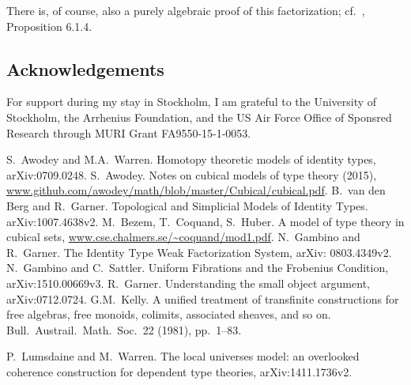 \documentclass[12pt]{article}
\theoremstyle{remark}
\theoremstyle{definition}
\begin{document}
There is, of course, also a purely algebraic proof of this factorization; cf.~\cite{GvdB}, Proposition 6.1.4.

\subsection*{Acknowledgements}
For support during my stay in Stockholm, I am grateful to the University of Stockholm, the Arrhenius Foundation, and  the US Air Force Office of Sponsred Research through MURI Grant FA9550-15-1-0053.

\begin{thebibliography}{300}

S.~Awodey and M.A.~Warren. Homotopy theoretic models of identity types, arXiv:0709.0248.
%
S.~Awodey. Notes on cubical models of type theory (2015), \url{www.github.com/awodey/math/blob/master/Cubical/cubical.pdf}.
%
B.~van den Berg and R.~Garner. Topological and Simplicial Models of Identity Types.  arXiv:1007.4638v2.
%
M.~Bezem, T.~Coquand, S.~Huber. A model of type theory in cubical sets, \url{www.cse.chalmers.se/~coquand/mod1.pdf}.
%
N.~Gambino and R.~Garner. The Identity Type Weak Factorization System, arXiv: 0803.4349v2.
%
N.~Gambino and C.~Sattler. Uniform Fibrations and the Frobenius Condition, arXiv:1510.00669v3.
%
R.~Garner. Understanding the small object argument, arXiv:0712.0724.
%
G.M.~Kelly. A unified treatment of transfinite constructions for free algebras, free monoids, colimits, associated sheaves, and so on. Bull.\ Austrail.\ Math.\ Soc.\ 22 (1981), pp.~1--83.%

  P.~Lumsdaine and M.~Warren.  The local universes model: an overlooked coherence construction for dependent type theories, arXiv:1411.1736v2.
\end{thebibliography}

\end{document}
